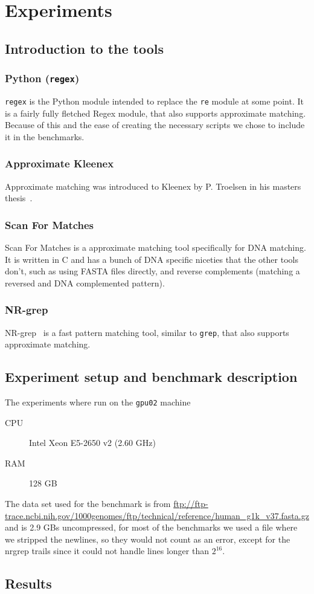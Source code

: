 \section{Experiments}

\subsection{Introduction to the tools}
\subsubsection{Python (\texttt{regex})}
\texttt{regex} is the Python module intended to replace the \texttt{re} module
at some point. It is a fairly fully fletched Regex module, that also supports
approximate matching. Because of this and the ease of creating the necessary
scripts we chose to include it in the benchmarks.

\subsubsection{Approximate Kleenex}
Approximate matching was introduced to Kleenex by P. Troelsen in his masters
thesis~\cite{troelsen2016approximate}.

\subsubsection{Scan For Matches}
Scan For Matches is a approximate matching tool specifically for DNA matching.
It is written in C and has a bunch of DNA specific niceties that the other
tools don't, such as using FASTA files directly, and reverse complements
(matching a reversed and DNA complemented pattern).

\subsubsection{NR-grep}
NR-grep~\cite{navarro2001nr} is a fast pattern matching tool, similar to
\texttt{grep}, that also supports approximate matching.


\subsection{Experiment setup and benchmark description}
The experiments where run on the \texttt{gpu02} machine
\begin{description}
    \item[CPU] Intel Xeon E5-2650 v2 (2.60 GHz)
    \item[RAM] 128 GB
\end{description}

The data set used for the benchmark is from
\url{ftp://ftp-trace.ncbi.nih.gov/1000genomes/ftp/technical/reference/human_g1k_v37.fasta.gz}
and is 2.9 GBs uncompressed, for most of the benchmarks we used a file where we
stripped the newlines, so they would not count as an error, except for the
nrgrep trails since it could not handle lines longer than $2^{16}$.


\subsection{Results}


